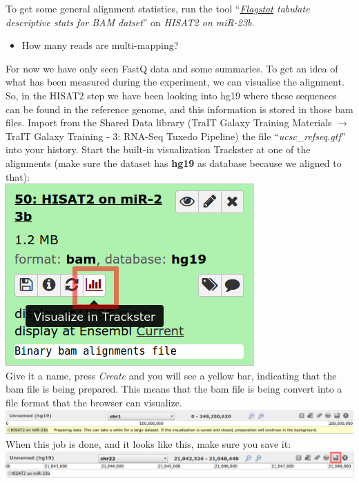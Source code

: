 To get some general alignment statistics, run the tool ``\textit{\underline{Flagstat} tabulate descriptive stats for BAM datset}'' on \textit{HISAT2 on miR-23b}.
\begin{itemize}
	\item How many reads are multi-mapping?
\end{itemize}
For now we have only seen FastQ data and some summaries. To get an idea of what has been measured during the experiment, we can visualise the alignment. So, in the HISAT2 step we have been looking into hg19 where these sequences can be found in the reference genome, and this information is stored in those bam files. Import from the Shared Data library (TraIT Galaxy Training Materials $\rightarrow$ TraIT Galaxy Training - 3: RNA-Seq Tuxedo Pipeline) the file ``\textit{ucsc\_refseq.gtf}'' into your history. Start the built-in visualization Trackster at one of the alignments (make sure the dataset has \textbf{hg19} as database because we aligned to that):\\
\includegraphics[scale=0.55]{figures/alignment_03}\\
Give it a name, press \textit{Create} and you will see a yellow bar, indicating that the bam file is being prepared. This means that the bam file is being convert into a file format that the browser can visualize. \includegraphics[width=\textwidth]{figures/alignment_04.png}\\
When this job is done, and it looks like this, make sure you save it:\\
\includegraphics[width=\textwidth]{figures/alignment_05.png}\\
